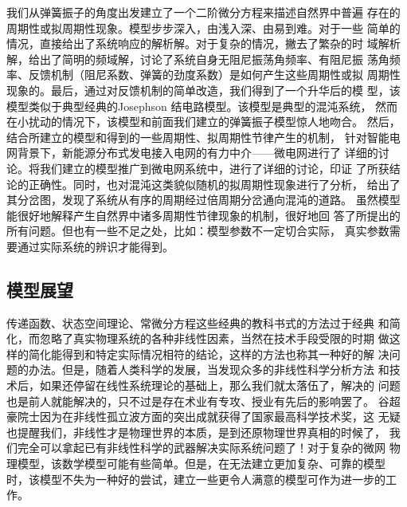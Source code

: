 \documentclass[withoutpreface,bwprint]{cumcmthesis} %
\begin{document}
我们从弹簧振子的角度出发建立了一个二阶微分方程来描述自然界中普遍
存在的周期性或拟周期性现象。模型步步深入，由浅入深、由易到难。对于一些
简单的情况，直接给出了系统响应的解析解。对于复杂的情况，撇去了繁杂的时
域解析解，给出了简明的频域解，讨论了系统自身无阻尼振荡角频率、有阻尼振
荡角频率、反馈机制（阻尼系数、弹簧的劲度系数）是如何产生这些周期性或拟
周期性现象的。最后，通过对反馈机制的简单改造，我们得到了一个升华后的模
型，该模型类似于典型经典的Josephson 结电路模型。该模型是典型的混沌系统，
然而在小扰动的情况下，该模型和前面我们建立的弹簧振子模型惊人地吻合。
然后，结合所建立的模型和得到的一些周期性、拟周期性节律产生的机制，
针对智能电网背景下，新能源分布式发电接入电网的有力中介——微电网进行了
详细的讨论。将我们建立的模型推广到微电网系统中，进行了详细的讨论，印证
了所获结论的正确性。同时，也对混沌这类貌似随机的拟周期性现象进行了分析，
给出了其分岔图，发现了系统从有序的周期经过倍周期分岔通向混沌的道路。
虽然模型能很好地解释产生自然界中诸多周期性节律现象的机制，很好地回
答了所提出的所有问题。但也有一些不足之处，比如：模型参数不一定切合实际，
真实参数需要通过实际系统的辨识才能得到。

\subsection{模型展望}
\label{sec6-2}

传递函数、状态空间理论、常微分方程这些经典的教科书式的方法过于经典
和简化，而忽略了真实物理系统的各种非线性因素，当然在技术手段受限的时期
做这样的简化能得到和特定实际情况相符的结论，这样的方法也称其一种好的解
决问题的办法。但是，随着人类科学的发展，当发现众多的非线性科学分析方法
和技术后，如果还停留在线性系统理论的基础上，那么我们就太落伍了，解决的
问题也是前人就能解决的，只不过是存在术业有专攻、授业有先后的影响罢了。
谷超豪院士因为在非线性孤立波方面的突出成就获得了国家最高科学技术奖，这
无疑也提醒我们，非线性才是物理世界的本质，是到还原物理世界真相的时候了，
我们完全可以拿起已有非线性科学的武器解决实际系统问题了！对于复杂的微网
物理模型，该数学模型可能有些简单。但是，在无法建立更加复杂、可靠的模型
时，该模型不失为一种好的尝试，建立一些更令人满意的模型可作为进一步的工
作。


\end{document}

